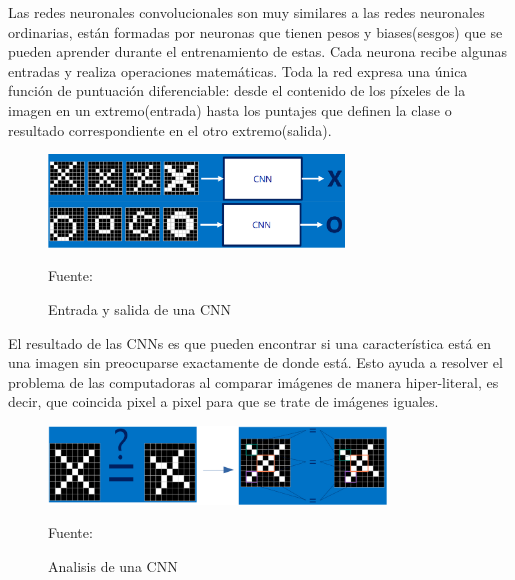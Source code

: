 	\vskip 0.4cm  
	Las redes neuronales convolucionales son muy similares a las redes neuronales ordinarias, están formadas por neuronas que tienen pesos y biases(sesgos) que se pueden aprender durante el entrenamiento de estas. Cada neurona recibe algunas entradas y realiza operaciones matemáticas. Toda la red expresa una única función de puntuación diferenciable: desde el contenido de los píxeles de la imagen en un extremo(entrada) hasta los puntajes que definen la clase o resultado correspondiente en el otro extremo(salida).

	\begin{figure}[H]
	\begin{center}
	\includegraphics[width=0.7\textwidth]{images/marcoteorico/entr_salida}
	\end{center}
	\begin{center}
	\caption{\small{Entrada y salida de una CNN}}
	\vskip -0.25cm
	{\small{Fuente: \citep{Rohrer}}}
	\end{center}
	\vspace{-1.5em}
	\end{figure}

	El resultado de las CNNs es que pueden encontrar si una característica está en una imagen sin preocuparse exactamente de donde está. Esto ayuda a resolver el problema de las computadoras al comparar imágenes de manera hiper-literal, es decir, que coincida pixel a pixel para que se trate de imágenes iguales.

	\begin{figure}[H]
	\begin{center}
	\includegraphics[width=0.8\textwidth]{images/marcoteorico/literalcomp}
	\end{center}
	\begin{center}
	\caption{\small{Analisis de una CNN}}
	\vskip -0.25cm
	{\small{Fuente: \citep{Rohrer}}}
	\end{center}
	\vspace{-1.5em}
	\end{figure}

